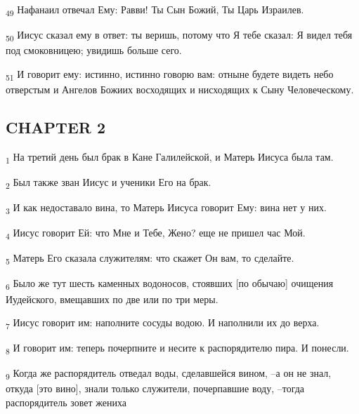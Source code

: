 \begin{tcolorbox}
\textsubscript{49} Нафанаил отвечал Ему: Равви! Ты Сын Божий, Ты Царь Израилев.
\end{tcolorbox}
\begin{tcolorbox}
\textsubscript{50} Иисус сказал ему в ответ: ты веришь, потому что Я тебе сказал: Я видел тебя под смоковницею; увидишь больше сего.
\end{tcolorbox}
\begin{tcolorbox}
\textsubscript{51} И говорит ему: истинно, истинно говорю вам: отныне будете видеть небо отверстым и Ангелов Божиих восходящих и нисходящих к Сыну Человеческому.
\end{tcolorbox}
\subsection{CHAPTER 2}
\begin{tcolorbox}
\textsubscript{1} На третий день был брак в Кане Галилейской, и Матерь Иисуса была там.
\end{tcolorbox}
\begin{tcolorbox}
\textsubscript{2} Был также зван Иисус и ученики Его на брак.
\end{tcolorbox}
\begin{tcolorbox}
\textsubscript{3} И как недоставало вина, то Матерь Иисуса говорит Ему: вина нет у них.
\end{tcolorbox}
\begin{tcolorbox}
\textsubscript{4} Иисус говорит Ей: что Мне и Тебе, Жено? еще не пришел час Мой.
\end{tcolorbox}
\begin{tcolorbox}
\textsubscript{5} Матерь Его сказала служителям: что скажет Он вам, то сделайте.
\end{tcolorbox}
\begin{tcolorbox}
\textsubscript{6} Было же тут шесть каменных водоносов, стоявших [по обычаю] очищения Иудейского, вмещавших по две или по три меры.
\end{tcolorbox}
\begin{tcolorbox}
\textsubscript{7} Иисус говорит им: наполните сосуды водою. И наполнили их до верха.
\end{tcolorbox}
\begin{tcolorbox}
\textsubscript{8} И говорит им: теперь почерпните и несите к распорядителю пира. И понесли.
\end{tcolorbox}
\begin{tcolorbox}
\textsubscript{9} Когда же распорядитель отведал воды, сделавшейся вином, --а он не знал, откуда [это вино], знали только служители, почерпавшие воду, --тогда распорядитель зовет жениха
\end{tcolorbox}
